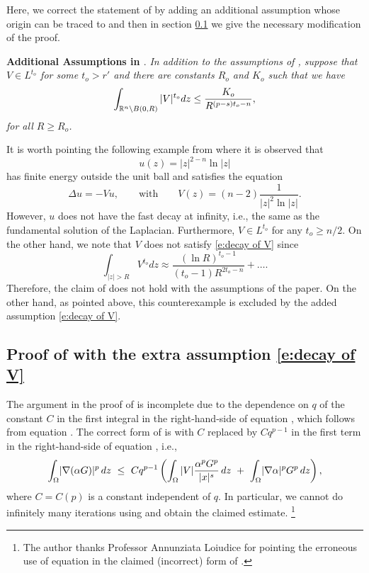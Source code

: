 \documentclass[10pt]{amsart}
\begin{document}
Here, we correct  the statement of \cite[Theorem 2.9]{V11} by adding an additional assumption whose origin can be traced to \cite[Lemma (4.2)]{Bando89} and  then in section \ref{ss:proof of T2.9} we give the necessary modification of the proof. 

\textbf{Additional Assumptions in \cite[Theorem 2.9]{V11}}.
\emph{In addition to the assumptions of \cite[Theorem 2.9]{V11}, suppose that $V\in L^{t_o}$ for some $t_o>r'$ and there are constants $R_o$ and $K_o$  such that we have
\begin{equation}\label{e:decay of V}
\int_{\mathbb{R}^n\setminus B(0,R)}|V|^{t_o}dz \leq \frac {K_o}{R^{(p-s)t_o-n}},
\end{equation}
for  all  $R\geq R_o$.}


It is worth pointing the following example from \cite[Example 3, p. 51]{E}  where it is observed that $$u(z)=|z|^{2-n}\ln |z|$$ has  finite energy outside the unit ball and satisfies the equation
\[
\Delta u=-Vu,\qquad\text{with}\qquad V(z)=(n-2)\frac {1}{|z|^2\ln |z|}.
\]
However, $u$ does not have the fast decay at infinity, i.e., the same as the fundamental solution of the Laplacian. Furthermore, $V\in L^{t_o}$ for any $t_o\geq n/2$.  On the other hand, we note that $V$ does not satisfy \eqref{e:decay of V} since
\[
\int_{|z|>R} V^{t_o} dz\approx \frac {\left( \ln R\right)^{t_o-1}}{(t_o-1)R^{2t_o-n}} +\dots.
\]
Therefore, the claim of \cite[Theorem 2.9]{V11} does not hold with the assumptions of the paper. On the other hand, as pointed above, this counterexample is excluded by the added assumption \eqref{e:decay of V}.


\subsection{Proof of \cite[Theorem 2.9]{V11} with  the extra assumption \eqref{e:decay of V}}\label{ss:proof of T2.9} The argument in the proof of \cite[Theorem 2.9]{V11} is incomplete due to the dependence on $q$ of the constant $C$ in the first integral in the right-hand-side of equation \cite[(2.52)]{V11}, which follows from equation   \cite[(2.16)]{V11}. The correct form of \cite[(2.52)]{V11} is with $C$ replaced by $Cq^{p-1}$ in the first term in the right-hand-side of equation \cite[(2.52)]{V11}, i.e.,
\begin{equation}\label{e:2.52 corrected}
\int_\Omega \lvert \nabla(\alpha G) \rvert^p\, dz\ \leq\ Cq^{p-1}\left (\int_{\Omega} |V|\frac
{\alpha^pG^p}{|x|^s}\,dz \ +\  \int_\Omega \lvert \nabla \alpha \rvert^p
G^p\, dz\right ),
\end{equation}
where $C=C(p)$ is a constant independent of $q$. In particular,
we cannot do infinitely many iterations using \cite[(2.53)]{V11} and obtain the claimed estimate. \footnote{ The author thanks Professor Annunziata Loiudice for pointing the erroneous use of equation \cite[(2.16)]{V11} in the claimed (incorrect) form of \cite[(2.52)]{V11}.}
\end{document}
